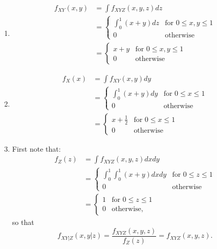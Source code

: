 \begin{problem}{1} $ $

	\begin{enumerate}
		\item 
	\begin{align*}  
 f_{XY}(x, y) &= \int f_{XYZ}(x, y, z) dz \\ 
 &= \begin{cases}
                                 \int_0^1 (x+y) dz& \text{for $0\le x, y\le 1$} \\
                                  0& \text{otherwise}
       \end{cases} \\
&= \begin{cases}
                                 x+y & \text{for $0\le x, y\le 1$} \\
                                  0& \text{otherwise}
       \end{cases}
\end{align*}
		
\item
	
	\begin{align*}  
 f_{X}(x) &= \int f_{XY}(x, y) dy \\ 
 &= \begin{cases}
                                 \int_0^1 (x+y) dy& \text{for $0\le x\le 1$} \\
                                  0& \text{otherwise}
       \end{cases} \\
&= \begin{cases}
                                 x+\frac{1}{2} & \text{for $0\le x\le 1$} \\
                                  0& \text{otherwise}
       \end{cases}
\end{align*}
	
		
		
\item First note that:
	\begin{align*}  
 f_{Z}(z) &= \int f_{XYZ}(x, y, z) dx dy \\ 
 &= \begin{cases}
                                 \int_0^1 \int_0^1 (x+y) dx dy & \text{for $0\le z \le 1$} \\
                                  0& \text{otherwise}
       \end{cases} \\
&= \begin{cases}
                                 1& \text{for $0\le z\le 1$} \\
                                  0& \text{otherwise},
       \end{cases}
\end{align*}
so that \begin{equation*}
f_{XY|Z}(x, y|z) = \frac{f_{XYZ}(x, y, z)}{f_Z(z)} = f_{XYZ}(x, y, z).
\end{equation*}




\end{enumerate}
\end{problem}
